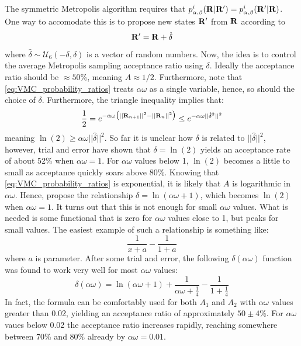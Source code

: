 \documentclass[nofootinbib,reprint,english]{revtex4-1}
\begin{document}
The symmetric Metropolis algorithm requires that \(p_{\alpha,\beta}^i(\vb{R}|\vb{R}')=p_{\alpha,\beta}^i(\vb{R}'|\vb{R})\). One way to accomodate this is to propose new states \(\vb{R}'\) from \(\vb{R}\) according to
\begin{equation}
\vb{R}'=\vb{R}+\hat{\delta}
\end{equation}
where \(\hat{\delta}\sim\mathcal{U}_6(-\delta,\delta)\) is a vector of random numbers. Now, the idea is to control the average Metropolis sampling acceptance ratio using \(\delta\). Ideally the acceptance ratio should be \(\approx50\)\%, meaning \(A\approx1/2\). Furthermore, note that \eqref{eq:VMC_probability_ratios} treats \(\alpha\omega\) as a single variable, hence, so should the choice of \(\delta\). Furthermore, the triangle inequality implies that:
\[\frac{1}{2}=e^{-\alpha\omega\big(||\vb{R}_{n+1}||^2-||\vb{R}_n||^2\big)}\leq e^{-\alpha\omega||\hat{\delta}^2||^2}\]
meaning \(\ln(2)\geq\alpha\omega||\hat{\delta}||^2\). So far it is unclear how \(\delta\) is related to \(||\hat{\delta}||^2\), however, trial and error have shown that \(\delta=\ln(2)\) yields an acceptance rate of about 52\% when \(\alpha\omega=1\). For \(\alpha\omega\) values below 1, \(\ln(2)\) becomes a little to small as acceptance quickly soars above 80\%. Knowing that \eqref{eq:VMC_probability_ratios} is exponential, it is likely that \(A\) is logarithmic in \(\alpha\omega\). Hence, propose the relationship \(\delta=\ln(\alpha\omega+1)\), which becomes \(\ln(2)\) when \(\alpha\omega=1\). It turns out that this is not enough for small \(\alpha\omega\) values. What is needed is some functional that is zero for \(\alpha\omega\) values close to 1, but peaks for small values. The easiest example of such a relationship is something like:
\[\frac{1}{x+a}-\frac{1}{1+a}\]
where \(a\) is parameter. After some trial and error, the following \(\delta(\alpha\omega)\) function was found to work very well for most \(\alpha\omega\) values:
\begin{equation}\label{eq:MC_max_step}
\delta(\alpha\omega)=\ln(\alpha\omega+1)+\frac{1}{\alpha\omega+\frac{1}{4}}-\frac{1}{1+\frac{1}{4}}
\end{equation}
In fact, the formula can be comfortably used for both \(A_1\) and \(A_2\) with \(\alpha\omega\) values greater than 0.02, yielding an acceptance ratio of approximately \(50\pm4\)\%. For \(\alpha\omega\) vaues below 0.02 the acceptance ratio increases rapidly, reaching somewhere between 70\% and 80\%  already by \(\alpha\omega=0.01\).
\end{document}
